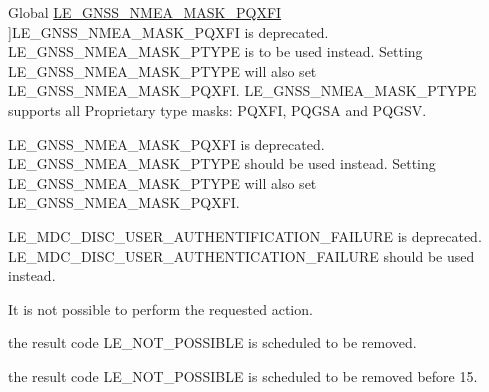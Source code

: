 \begin{DoxyRefList}
\hypertarget{deprecated__deprecated000011}{}%
Global \hyperlink{le__gnss__interface_8h_ad40fd63901477f695a1d5936a5ade316}{L\+E\+\_\+\+G\+N\+S\+S\+\_\+\+N\+M\+E\+A\+\_\+\+M\+A\+S\+K\+\_\+\+P\+Q\+X\+FI} ]L\+E\+\_\+\+G\+N\+S\+S\+\_\+\+N\+M\+E\+A\+\_\+\+M\+A\+S\+K\+\_\+\+P\+Q\+X\+FI is deprecated. L\+E\+\_\+\+G\+N\+S\+S\+\_\+\+N\+M\+E\+A\+\_\+\+M\+A\+S\+K\+\_\+\+P\+T\+Y\+PE is to be used instead. Setting L\+E\+\_\+\+G\+N\+S\+S\+\_\+\+N\+M\+E\+A\+\_\+\+M\+A\+S\+K\+\_\+\+P\+T\+Y\+PE will also set L\+E\+\_\+\+G\+N\+S\+S\+\_\+\+N\+M\+E\+A\+\_\+\+M\+A\+S\+K\+\_\+\+P\+Q\+X\+FI. L\+E\+\_\+\+G\+N\+S\+S\+\_\+\+N\+M\+E\+A\+\_\+\+M\+A\+S\+K\+\_\+\+P\+T\+Y\+PE supports all Proprietary type masks\+: P\+Q\+X\+FI, P\+Q\+G\+SA and P\+Q\+G\+SV.  
\item[\label{deprecated__deprecated000013}%
\hypertarget{deprecated__deprecated000013}{}%
Global \hyperlink{le__gnss__interface_8h_ab9253e29d74cae6e962dcc8b94f0e3c1}{le\+\_\+gnss\+\_\+\+Set\+Nmea\+Sentences} (le\+\_\+gnss\+\_\+\+Nmea\+Bit\+Mask\+\_\+t nmea\+Mask)]L\+E\+\_\+\+G\+N\+S\+S\+\_\+\+N\+M\+E\+A\+\_\+\+M\+A\+S\+K\+\_\+\+P\+Q\+X\+FI is deprecated. L\+E\+\_\+\+G\+N\+S\+S\+\_\+\+N\+M\+E\+A\+\_\+\+M\+A\+S\+K\+\_\+\+P\+T\+Y\+PE should be used instead. Setting L\+E\+\_\+\+G\+N\+S\+S\+\_\+\+N\+M\+E\+A\+\_\+\+M\+A\+S\+K\+\_\+\+P\+T\+Y\+PE will also set L\+E\+\_\+\+G\+N\+S\+S\+\_\+\+N\+M\+E\+A\+\_\+\+M\+A\+S\+K\+\_\+\+P\+Q\+X\+FI.  
\item[\label{deprecated__deprecated000014}%
\hypertarget{deprecated__deprecated000014}{}%
Global \hyperlink{le__mdc__interface_8h_a16f5386bc285f7eb7fdf7faa8cc93813}{L\+E\+\_\+\+M\+D\+C\+\_\+\+D\+I\+S\+C\+\_\+\+U\+S\+E\+R\+\_\+\+A\+U\+T\+H\+E\+N\+T\+I\+F\+I\+C\+A\+T\+I\+O\+N\+\_\+\+F\+A\+I\+L\+U\+RE} ]L\+E\+\_\+\+M\+D\+C\+\_\+\+D\+I\+S\+C\+\_\+\+U\+S\+E\+R\+\_\+\+A\+U\+T\+H\+E\+N\+T\+I\+F\+I\+C\+A\+T\+I\+O\+N\+\_\+\+F\+A\+I\+L\+U\+RE is deprecated. L\+E\+\_\+\+M\+D\+C\+\_\+\+D\+I\+S\+C\+\_\+\+U\+S\+E\+R\+\_\+\+A\+U\+T\+H\+E\+N\+T\+I\+C\+A\+T\+I\+O\+N\+\_\+\+F\+A\+I\+L\+U\+RE should be used instead.  
\item[\label{deprecated__deprecated000005}%
\hypertarget{deprecated__deprecated000005}{}%
Global \hyperlink{le__basics_8h_a1cca095ed6ebab24b57a636382a6c86ca6bff37e5294d5f5be87549661e30844d}{L\+E\+\_\+\+N\+O\+T\+\_\+\+P\+O\+S\+S\+I\+B\+LE} ]It is not possible to perform the requested action.  
\item[\label{deprecated__deprecated000004}%
\hypertarget{deprecated__deprecated000004}{}%
Global \hyperlink{le__basics_8h_a1cca095ed6ebab24b57a636382a6c86c}{le\+\_\+result\+\_\+t} ]the result code L\+E\+\_\+\+N\+O\+T\+\_\+\+P\+O\+S\+S\+I\+B\+LE is scheduled to be removed.  
\item[\label{deprecated__deprecated000007}%
\hypertarget{deprecated__deprecated000007}{}%
Global \hyperlink{le__thread_8h_adf7f24fec4859ca12a52b16ce43fd9b8}{le\+\_\+thread\+\_\+\+Join} (le\+\_\+thread\+\_\+\+Ref\+\_\+t thread, void $\ast$$\ast$result\+Value\+Ptr)]the result code L\+E\+\_\+\+N\+O\+T\+\_\+\+P\+O\+S\+S\+I\+B\+LE is scheduled to be removed before 15.


\end{DoxyRefList}
